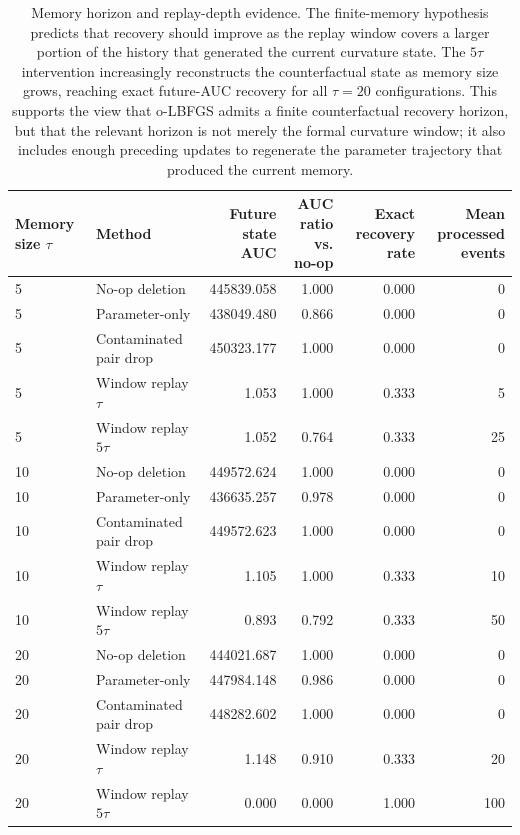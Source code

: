 \documentclass{ssl}
\begin{document}
\begin{landscape}
\begin{table}[t]
\centering
\caption{
Memory horizon and replay-depth evidence. 
The finite-memory hypothesis predicts that recovery should improve as the replay window covers a larger portion of the history that generated the current curvature state. 
The $5\tau$ intervention increasingly reconstructs the counterfactual state as memory size grows, reaching exact future-AUC recovery for all $\tau=20$ configurations. 
This supports the view that o-LBFGS admits a finite counterfactual recovery horizon, but that the relevant horizon is not merely the formal curvature window; it also includes enough preceding updates to regenerate the parameter trajectory that produced the current memory.
}
\label{tab:memory-horizon-replay-depth}
\small
\begin{tabularx}{\textwidth}{llrrrr}
\toprule
Memory size $\tau$ 
& Method 
& \makecell{Future\\state AUC}
& \makecell{AUC ratio\\vs. no-op}
& \makecell{Exact recovery\\rate}
& \makecell{Mean processed\\events} \\
\midrule
5 
& No-op deletion 
& 445839.058 & 1.000 & 0.000 & 0 \\
5 
& Parameter-only 
& 438049.480 & 0.866 & 0.000 & 0 \\
5 
& Contaminated pair drop 
& 450323.177 & 1.000 & 0.000 & 0 \\
5 
& Window replay $\tau$ 
& 1.053 & 1.000 & 0.333 & 5 \\
5 
& Window replay $5\tau$ 
& 1.052 & 0.764 & 0.333 & 25 \\
\midrule
10 
& No-op deletion 
& 449572.624 & 1.000 & 0.000 & 0 \\
10 
& Parameter-only 
& 436635.257 & 0.978 & 0.000 & 0 \\
10 
& Contaminated pair drop 
& 449572.623 & 1.000 & 0.000 & 0 \\
10 
& Window replay $\tau$ 
& 1.105 & 1.000 & 0.333 & 10 \\
10 
& Window replay $5\tau$ 
& 0.893 & 0.792 & 0.333 & 50 \\
\midrule
20 
& No-op deletion 
& 444021.687 & 1.000 & 0.000 & 0 \\
20 
& Parameter-only 
& 447984.148 & 0.986 & 0.000 & 0 \\
20 
& Contaminated pair drop 
& 448282.602 & 1.000 & 0.000 & 0 \\
20 
& Window replay $\tau$ 
& 1.148 & 0.910 & 0.333 & 20 \\
20 
& Window replay $5\tau$ 
& 0.000 & 0.000 & 1.000 & 100 \\
\bottomrule
\end{tabularx}
\end{table}
\end{landscape}
\end{document}
